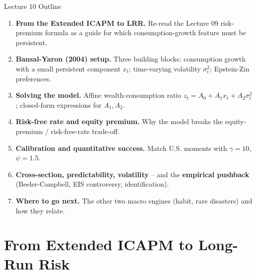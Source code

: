 \documentclass{beamer}
\begin{document}
\begin{frame}{Lecture 10 Outline}
	\begin{enumerate}
		\item \textbf{From the Extended ICAPM to LRR.} Re-read the Lecture 09 risk-premium formula as a guide for which consumption-growth feature must be persistent.
		\item \textbf{Bansal-Yaron (2004) setup.} Three building blocks: consumption growth with a small persistent component $x_t$; time-varying volatility $\sigma_t^2$; Epstein-Zin preferences.
		\item \textbf{Solving the model.} Affine wealth-consumption ratio $z_t = A_0 + A_1 x_t + A_2\sigma_t^2$; closed-form expressions for $A_1, A_2$.
		\item \textbf{Risk-free rate and equity premium.} Why the model breaks the equity-premium / risk-free-rate trade-off.
		\item \textbf{Calibration and quantitative success.} Match U.S. moments with $\gamma=10$, $\psi=1.5$.
		\item \textbf{Cross-section, predictability, volatility} -- and the \textbf{empirical pushback} (Beeler-Campbell, EIS controversy, identification).
		\item \textbf{Where to go next.} The other two macro engines (habit, rare disasters) and how they relate.
	\end{enumerate}
\end{frame}

\section{From Extended ICAPM to Long-Run Risk}
\end{document}
